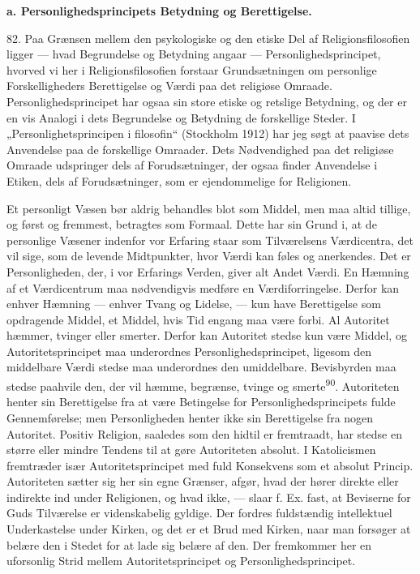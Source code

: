 \documentclass[12pt,a4paper,openany]{book}
\newcommand{\opage}[1]{\marginnote{\footnotesize\textit{[#1]}}}
\begin{document}
\begin{center}\textbf{a. Personlighedsprincipets Betydning og Berettigelse.}\end{center}

82. Paa Grænsen mellem den psykologiske og den etiske Del af
Religionsfilosofien ligger --- hvad Begrundelse og Betydning angaar ---
Personlighedsprincipet, hvorved vi her i Religionsfilosofien forstaar
Grundsætningen om personlige Forskelligheders Berettigelse og Værdi paa
det religiøse Omraade. Personlighedsprincipet har ogsaa sin store etiske
og retslige Betydning, og der er en vis Analogi i dets Begrundelse og
Betydning de forskellige Steder. I „Personlighetsprincipen i filosofin“
(Stockholm 1912) har jeg søgt at paavise dets Anvendelse paa de
forskellige Omraader. Dets Nødvendighed paa det religiøse Omraade
udspringer dels af Forudsætninger, der ogsaa finder Anvendelse i Etiken,
dels af Forudsætninger, som er ejendommelige for Religionen.

Et personligt Væsen bør aldrig behandles blot som Middel, men maa altid
tillige, og først og fremmest, betragtes som Formaal. Dette har sin
Grund i, at de personlige Væsener indenfor vor Erfaring staar som
Tilværelsens Værdicentra, det vil sige, som de levende Midtpunkter, hvor
Værdi kan føles og anerkendes. Det er Personligheden, der, i vor
Erfarings Verden, giver alt Andet Værdi. En Hæmning af et Værdicentrum
maa nødvendigvis medføre en Værdiforringelse. Derfor kan enhver Hæmning
--- enhver Tvang og Lidelse, --- kun have Berettigelse som opdragende
Middel, et Middel, hvis Tid engang maa være forbi. Al Autoritet hæmmer,
tvinger eller smerter. Derfor kan Autoritet stedse kun være Middel, og
Autoritetsprincipet maa underordnes Personlighedsprincipet, ligesom den
middelbare Værdi
\opage{191}stedse maa underordnes den umiddelbare. Bevisbyrden maa
stedse paahvile den, der vil hæmme, begrænse, tvinge og
smerte\textsuperscript{90}. Autoriteten henter sin Berettigelse fra at
være Betingelse for Personlighedsprincipets fulde Gennemførelse; men
Personligheden henter ikke sin Berettigelse fra nogen Autoritet. Positiv
Religion, saaledes som den hidtil er fremtraadt, har stedse en større
eller mindre Tendens til at gøre Autoriteten absolut. I Katolicismen
fremtræder især Autoritetsprincipet med fuld Konsekvens som et absolut
Princip. Autoriteten sætter sig her sin egne Grænser, afgør, hvad der
hører direkte eller indirekte ind under Religionen, og hvad ikke, ---
slaar f. Ex. fast, at Beviserne for Guds Tilværelse er videnskabelig
gyldige. Der fordres fuldstændig intellektuel Underkastelse under
Kirken, og det er et Brud med Kirken, naar man forsøger at belære den i
Stedet for at lade sig belære af den. Der fremkommer her en uforsonlig
Strid mellem Autoritetsprincipet og Personlighedsprincipet.
\end{document}
